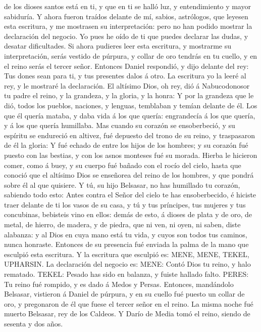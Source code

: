de los dioses santos está en ti, y que en ti se halló luz, y
entendimiento y mayor sabiduría.  Y ahora fueron traídos
delante de mí, sabios, astrólogos, que leyesen esta escritura, y me
mostrasen su interpretación: pero no han podido mostrar la declaración
del negocio.  Yo pues he oído de ti que puedes declarar
las dudas, y desatar dificultades. Si ahora pudieres leer esta
escritura, y mostrarme su interpretación, serás vestido de púrpura, y
collar de oro tendrás en tu cuello, y en el reino serás el tercer señor.
 Entonces Daniel respondió, y dijo delante del rey: Tus
dones sean para ti, y tus presentes dalos á otro. La escritura yo la
leeré al rey, y le mostraré la declaración.  El altísimo
Dios, oh rey, dió á Nabucodonosor tu padre el reino, y la grandeza, y la
gloria, y la honra:  Y por la grandeza que le dió, todos
los pueblos, naciones, y lenguas, temblaban y temían delante de él. Los
que él quería mataba, y daba vida á los que quería: engrandecía á los
que quería, y á los que quería humillaba.  Mas cuando su
corazón se ensoberbeció, y su espíritu se endureció en altivez, fué
depuesto del trono de su reino, y traspasaron de él la gloria:
 Y fué echado de entre los hijos de los hombres; y su
corazón fué puesto con las bestias, y con los asnos monteses fué su
morada. Hierba le hicieron comer, como á buey, y su cuerpo fué bañado
con el rocío del cielo, hasta que conoció que el altísimo Dios se
enseñorea del reino de los hombres, y que pondrá sobre él al que
quisiere.  Y tú, su hijo Belsasar, no has humillado tu
corazón, sabiendo todo esto:  Antes contra el Señor del
cielo te has ensoberbecido, é hiciste traer delante de ti los vasos de
su casa, y tú y tus príncipes, tus mujeres y tus concubinas, bebisteis
vino en ellos: demás de esto, á dioses de plata y de oro, de metal, de
hierro, de madera, y de piedra, que ni ven, ni oyen, ni saben, diste
alabanza: y al Dios en cuya mano está tu vida, y cuyos son todos tus
caminos, nunca honraste.  Entonces de su presencia fué
enviada la palma de la mano que esculpió esta escritura. 
Y la escritura que esculpió es: MENE, MENE, TEKEL, UPHARSIN.
 La declaración del negocio es: MENE: Contó Dios tu
reino, y halo rematado.  TEKEL: Pesado has sido en
balanza, y fuiste hallado falto.  PERES: Tu reino fué
rompido, y es dado á Medos y Persas.  Entonces,
mandándolo Belsasar, vistieron á Daniel de púrpura, y en su cuello fué
puesto un collar de oro, y pregonaron de él que fuese el tercer señor en
el reino.  La misma noche fué muerto Belsasar, rey de los
Caldeos.  Y Darío de Media tomó el reino, siendo de
sesenta y dos años.

